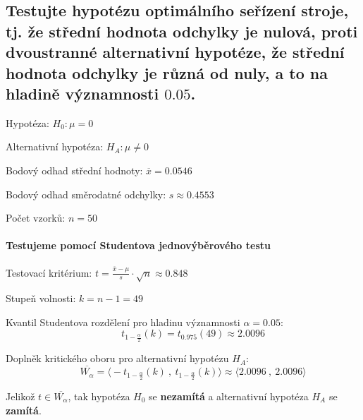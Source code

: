 
\subsection{Testujte hypotézu optimálního seřízení stroje, tj. že střední hodnota odchylky je nulová, proti dvoustranné alternativní hypotéze, že střední hodnota odchylky je různá od nuly, a to na hladině významnosti $0.05$.}

\begin{compactitem}
    \item Hypotéza: ${\displaystyle H_0 : \mu = 0}$

    \item Alternativní hypotéza: ${\displaystyle H_{A} : \mu \neq 0}$

    \item Bodový odhad střední hodnoty: ${\displaystyle \overline{x} = 0.0546}$

    \item Bodový odhad směrodatné odchylky: ${\displaystyle s \approx 0.4553}$

    \item Počet vzorků: ${\displaystyle n = 50}$
\end{compactitem}

\paragraph*{Testujeme pomocí Studentova jednovýběrového testu}

\begin{compactitem}
    \item Testovací kritérium: ${\displaystyle t = \frac{\overline{x} - \mu}{s} \cdot \sqrt{n} \approx 0.848}$

    \item Stupeň volnosti: ${\displaystyle k = n - 1 = 49}$

    \item Kvantil Studentova rozdělení pro hladinu významnosti ${\displaystyle \alpha = 0.05}$:
    $${\displaystyle \qquad t_{1 - \frac{\alpha}{2}}(k) = t_{0.975}(49) \approx 2.0096}$$

    \item Doplněk kritického oboru pro alternativní hypotézu ${\displaystyle H_{A}}$:
    $${\displaystyle \qquad \overline{W_\alpha} = \big\langle -t_{1 - \frac{\alpha}{2}}(k) ~,~ t_{1 - \frac{\alpha}{2}}(k) \big\rangle \approx \big\langle 2.0096 ~,~ 2.0096 \big\rangle}$$

    \item Jelikož ${\displaystyle t \in \overline{W_\alpha}}$, tak hypotéza ${\displaystyle H_0}$ se \textbf{nezamítá} a alternativní hypotéza ${\displaystyle H_A}$ se \textbf{zamítá}.
\end{compactitem}

